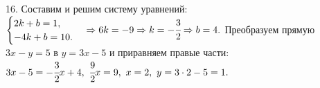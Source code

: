 16. Составим и решим систему уравнений: $\begin{cases} 2k+b=1,\\ -4k+b=10.\end{cases}\Rightarrow 6k=-9\Rightarrow k=-\cfrac{3}{2}\Rightarrow b=4.$
Преобразуем прямую $3x-y=5$ в $y=3x-5$ и приравняем правые части: $3x-5=-\cfrac{3}{2}x+4,\ \cfrac{9}{2}x=9,\ x=2,\ y=3\cdot2-5=1.$\\
